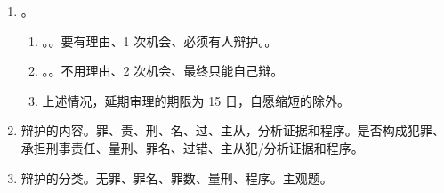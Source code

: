 \begin{enumerate}
\begin{enumerate}
\begin{enumerate}
                  \item 保密、揭发违法行为。过去统统要保密，将来国、公、人身要揭发。
                \end{enumerate}
          \item 辩护律师涉嫌犯罪。
                \begin{enumerate}
                  \item 干扰诉讼活动行为 + 可能追究刑事责任 \yjt 上一级 \hz 上一级指定。
                  \item 原来的管可能涉嫌打击报复。
                \end{enumerate}
          \item 辩护意见。无罪、有罪；量刑可当庭 \hz 庭后。
        \end{enumerate}
  \item {}。
        \begin{enumerate}
          \item {}。。要有理由、1 次机会、必须有人辩护。。
          \item {}。。不用理由、2 次机会、最终只能自己辩。
          \item 上述情况，延期审理的期限为 15 日，自愿缩短的除外。
        \end{enumerate}
  \item 辩护的内容。罪、责、刑、名、过、主从，分析证据和程序。是否构成犯罪、承担刑事责任、量刑、罪名、过错、主从犯/分析证据和程序。
  \item 辩护的分类。无罪、罪名、罪数、量刑、程序。主观题。
\end{enumerate}
